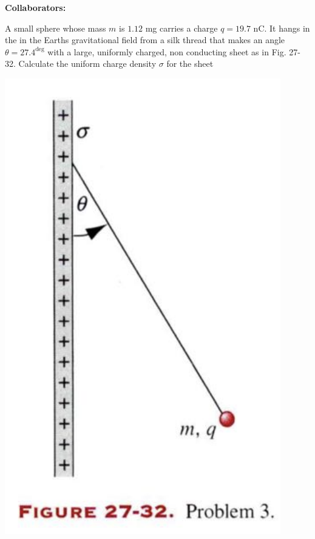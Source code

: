 \documentclass[11pt,letterpaper,boxed]{hmcpset}
\begin{document}
\noindent\textbf{Collaborators:} 


\begin{problem}
A small sphere whose mass $m$ is $1.12$ mg carries a charge $q = 19.7$ nC. It hangs in the in the Earths gravitational field from a silk thread that makes an angle $\theta = 27.4^{\deg}$ with a large, uniformly charged, non conducting sheet as in Fig. 27-32. Calculate the uniform charge density $\sigma$ for the sheet
\begin{center}
\includegraphics[scale=0.6]{27-32.png}
\end{center} 
\end{problem}
\end{document}

